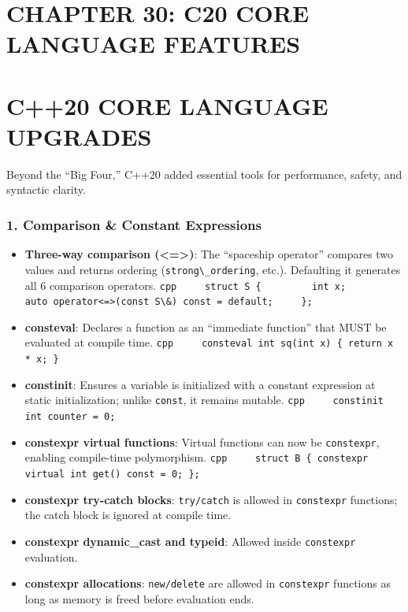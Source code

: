 \hypertarget{chapter-30-c20-core-language-features}{%
\section{CHAPTER 30: C20 CORE LANGUAGE
FEATURES}\label{chapter-30-c20-core-language-features}}

\hypertarget{c20-core-language-upgrades}{%
\section{C++20 CORE LANGUAGE
UPGRADES}\label{c20-core-language-upgrades}}

Beyond the ``Big Four,'' C++20 added essential tools for performance,
safety, and syntactic clarity.

\hypertarget{comparison-constant-expressions}{%
\subsubsection{1. Comparison \& Constant
Expressions}\label{comparison-constant-expressions}}

\begin{itemize}
\tightlist
\item
  \textbf{Three-way comparison (\textless=\textgreater)}: The
  ``spaceship operator'' compares two values and returns ordering
  (\passthrough{\lstinline!strong\_ordering!}, etc.). Defaulting it
  generates all 6 comparison operators.
  \passthrough{\lstinline!cpp     struct S \{         int x;         auto operator<=>(const S\&) const = default;     \};!}
\item
  \textbf{consteval}: Declares a function as an ``immediate function''
  that MUST be evaluated at compile time.
  \passthrough{\lstinline!cpp     consteval int sq(int x) \{ return x * x; \}!}
\item
  \textbf{constinit}: Ensures a variable is initialized with a constant
  expression at static initialization; unlike
  \passthrough{\lstinline!const!}, it remains mutable.
  \passthrough{\lstinline!cpp     constinit int counter = 0;!}
\item
  \textbf{constexpr virtual functions}: Virtual functions can now be
  \passthrough{\lstinline!constexpr!}, enabling compile-time
  polymorphism.
  \passthrough{\lstinline!cpp     struct B \{ constexpr virtual int get() const = 0; \};!}
\item
  \textbf{constexpr try-catch blocks}:
  \passthrough{\lstinline!try/catch!} is allowed in
  \passthrough{\lstinline!constexpr!} functions; the catch block is
  ignored at compile time.
\item
  \textbf{constexpr dynamic\_cast and typeid}: Allowed inside
  \passthrough{\lstinline!constexpr!} evaluation.
\item
  \textbf{constexpr allocations}: \passthrough{\lstinline!new/delete!}
  are allowed in \passthrough{\lstinline!constexpr!} functions as long
  as memory is freed before evaluation ends.
\end{itemize}

